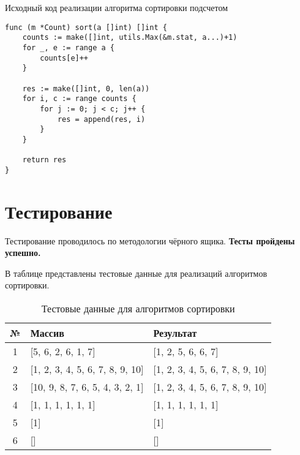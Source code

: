 \begin{code}
\caption{Исходный код реализации алгоритма сортировки подсчетом}
\label{code:count}
\begin{verbatim}
func (m *Count) sort(a []int) []int {
	counts := make([]int, utils.Max(&m.stat, a...)+1)
	for _, e := range a {
		counts[e]++
	}

	res := make([]int, 0, len(a))
	for i, c := range counts {
		for j := 0; j < c; j++ {
			res = append(res, i)
		}
	}

	return res
}
\end{verbatim}
\end{code}

\section{Тестирование}
Тестирование проводилось по методологии чёрного ящика. \textbf{Тесты пройдены успешно.}

В таблице  представлены тестовые данные для реализаций алгоритмов сортировки. 

\begin{table}[H]
  \caption{\label{table:tests} Тестовые данные для алгоритмов сортировки}
  \begin{center}
    \begin{tabular}{|c|l|l|}
      \hline
      № & Массив & Результат \\ \hline
      1 
      & 
      [5, 6, 2, 6, 1, 7]
      &
      [1, 2, 5, 6, 6, 7]
      \\ \hline
      
      2
      & 
      [1, 2, 3, 4, 5, 6, 7, 8, 9, 10]
      &
      [1, 2, 3, 4, 5, 6, 7, 8, 9, 10]
      \\ \hline
      
      3 
      & 
      [10, 9, 8, 7, 6, 5, 4, 3, 2, 1]
      &
      [1, 2, 3, 4, 5, 6, 7, 8, 9, 10]
      \\ \hline
      
      4 
      & 
      [1, 1, 1, 1, 1, 1]
      &
      [1, 1, 1, 1, 1, 1]
      \\ \hline
      
      5 
      & 
      [1]
      &
      [1]
      \\ \hline
      
      6 
      & 
      []
      &
      []
      \\ \hline
    \end{tabular}
  \end{center}
\end{table}

\newpage
